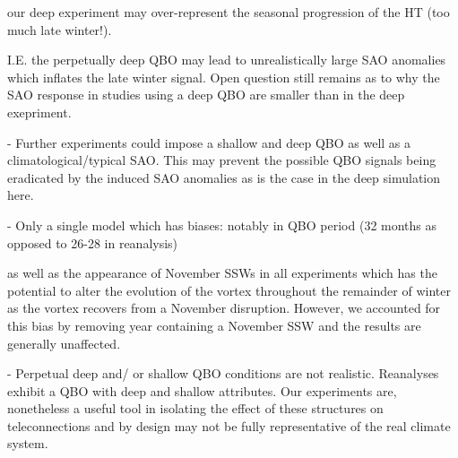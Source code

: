     our deep experiment may over-represent the seasonal progression of the HT (too much late winter!). 

    I.E. the perpetually deep QBO may lead to unrealistically large SAO anomalies which inflates the late winter signal. Open question still remains as to why the SAO response in studies using a deep QBO are smaller than in the deep exepriment. 
    
    - Further experiments could impose a shallow and deep QBO as well as a climatological/typical SAO. This may prevent the possible QBO signals being eradicated by the induced SAO anomalies as is the case in the deep simulation here. 

- Only a single model which has biases: 
    notably in QBO period (32 months as opposed to 26-28 in reanalysis) 

    as well as the appearance of November SSWs in all experiments which has the potential to alter the evolution of the vortex throughout the remainder of winter as the vortex recovers from a November disruption. However, we accounted for this bias by removing year containing a November SSW and the results are generally unaffected.

- Perpetual deep and/ or shallow QBO conditions are not realistic. Reanalyses exhibit a QBO with deep and shallow attributes. Our experiments are, nonetheless a useful tool in isolating the effect of these structures on teleconnections and by design may not be fully representative of the real climate system. 


